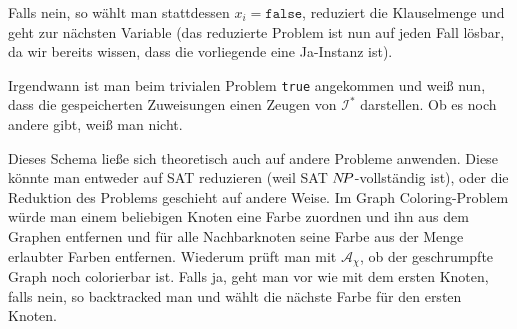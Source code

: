 \documentclass{article}
\begin{document}
Falls nein, so wählt man stattdessen $x_i = \texttt{false}$, reduziert die
Klauselmenge und geht zur nächsten Variable (das reduzierte Problem ist nun auf
jeden Fall lösbar, da wir bereits wissen, dass die vorliegende eine
Ja-Instanz ist).

Irgendwann ist man beim trivialen Problem \texttt{true} angekommen und weiß nun,
dass die gespeicherten Zuweisungen einen Zeugen von $\mathcal{I}^*$ darstellen.
Ob es noch andere gibt, weiß man nicht.

Dieses Schema ließe sich theoretisch auch auf andere Probleme anwenden. Diese
könnte man entweder auf SAT reduzieren (weil SAT $N\kern-2ptP$-vollständig ist), oder
die Reduktion des Problems geschieht auf andere Weise. Im Graph Coloring-Problem
würde man einem beliebigen Knoten eine Farbe zuordnen und ihn aus dem Graphen
entfernen und für alle Nachbarknoten seine Farbe aus der Menge erlaubter Farben
entfernen. Wiederum prüft man mit $\mathcal{A}_\chi$, ob der geschrumpfte Graph
noch colorierbar ist. Falls ja, geht man vor wie mit dem ersten Knoten, falls
nein, so backtracked man und wählt die nächste Farbe für den ersten Knoten.
\end{document}
